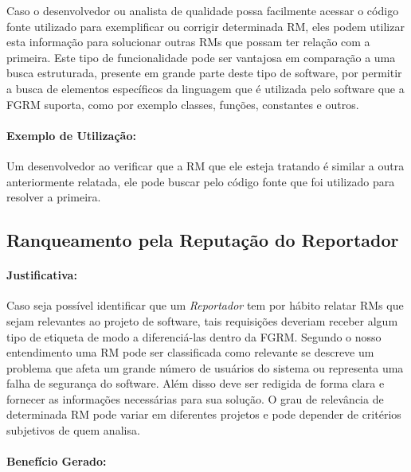 Caso o desenvolvedor ou analista de qualidade possa facilmente acessar o código
fonte utilizado para exemplificar ou corrigir determinada RM, eles podem
utilizar esta informação para solucionar outras RMs que possam ter relação com
a primeira. Este tipo de funcionalidade pode ser vantajosa em comparação a uma
busca estruturada, presente em grande parte deste tipo de software, por permitir
a busca de elementos específicos da linguagem que é utilizada pelo software que
a FGRM suporta, como por exemplo classes, funções, constantes e outros.

\paragraph{Exemplo de Utilização:}
\label{par:exemplo_s02}

Um desenvolvedor ao verificar que a RM que ele esteja tratando é similar a outra
anteriormente relatada, ele pode buscar pelo código fonte que foi utilizado para
resolver a primeira.

\subsection{Ranqueamento pela Reputação do Reportador}
\label{sub:diferenciacao_do_reportdor}


\paragraph{Justificativa:}
\label{par:justificativa_s03}

Caso seja possível identificar que um \textit{Reportador} tem por hábito relatar
RMs que sejam relevantes ao projeto de software, tais requisições deveriam
receber algum tipo de etiqueta de modo a diferenciá-las dentro da FGRM\@.
Segundo o nosso entendimento uma RM pode ser classificada como relevante se
descreve um problema que afeta um grande número de usuários do sistema ou
representa uma falha de segurança do software. Além disso deve ser redigida de
forma clara e fornecer as informações necessárias para sua solução. O grau de
relevância de determinada RM pode variar em diferentes projetos e pode depender
de critérios subjetivos de quem analisa.

\paragraph{Benefício Gerado:}
\label{par:papéis_afetados_s03}

